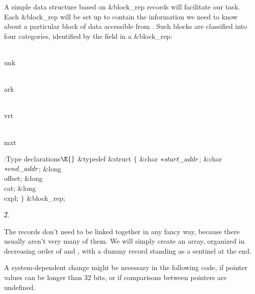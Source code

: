 A simple data structure based on \&{block\_rep} records will
facilitate our task.  Each \&{block\_rep} will be set up to contain
the information we need to know about a particular block of data
accessible from . Such blocks are classified into four
categories, identified by the  field in a \&{block\_rep}:

\Y\B\4\D\\{unk}\5
\par
\B\4\D\\{ark}\5
%
\par
\B\4\D\\{vrt}\5
\par
\B\4\D\\{mxt}\5
%
\par
\Y\B\4:Type declarations\X${}\E{}$\6
\&{typedef} \&{struct} ${}\{{}$\1\6
\&{char} ${}{*}\\{start\_addr}{}$;\6
\&{char} ${}{*}\\{end\_addr}{}$;\6
\&{long} \\{offset};\6
\&{long} \\{cat};\6
\&{long} \\{expl};\2\6
${}\}{}$ \&{block\_rep};\par
\U2.\fi

The  records don't need to be linked together in any
fancy way,
because there usually aren't very many of them. We will simply create
an array, organized in decreasing order of  and , with a
dummy record standing as a sentinel at the end.

A system-dependent change might be necessary in the following code,
if pointer values can be longer than 32 bits, or if comparisons between
pointers are undefined.

